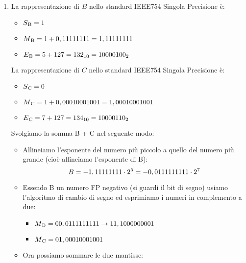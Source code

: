 \documentclass{article}
\begin{document}
\begin{enumerate}
    \item La rappresentazione di $B$ nello standard IEEE754 Singola Precisione è:
    \begin{itemize}
        \item[] $S\textsubscript{B}=1$
        \item[] $M\textsubscript{B}=1+0,11111111=1,11111111$
        \item[] $E\textsubscript{B}=5+127=132\textsubscript{10}=10000100\textsubscript{2}$
    \end{itemize}
    La rappresentazione di $C$ nello standard IEEE754 Singola Precisione è:
    \begin{itemize}
        \item[] $S\textsubscript{C}=0$
        \item[] $M\textsubscript{C}=1+0,00010001001=1,00010001001$
        \item[] $E\textsubscript{C}=7+127=134\textsubscript{10}=10000110\textsubscript{2}$
    \end{itemize}
    Svolgiamo la somma B + C nel seguente modo:
    \begin{itemize}
        \item Allineiamo l'esponente del numero pi\`u piccolo a quello del numero pi\`u grande (cio\`e allineiamo l'esponente di B):
$$B=-1,11111111\cdot2\textsuperscript{5}=-0,0111111111\cdot2\textsuperscript{7}$$
        \item Essendo B un numero FP negativo (si guardi il bit di segno) usiamo l'algoritmo di cambio di segno ed esprimiamo i numeri in complemento a due:
            \begin{itemize}
                \item[] $M\textsubscript{B}=00,0111111111 \rightarrow 11,1000000001$
                \item[] $M\textsubscript{C}=01,00010001001$
            \end{itemize}
        \item Ora possiamo sommare le due mantisse:
        \begin{center}
\end{center}
\end{itemize}
\end{enumerate}
\end{document}
